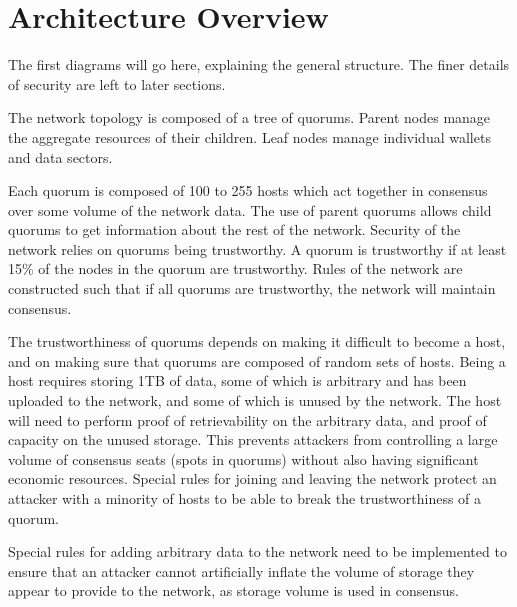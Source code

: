 \documentclass[twocolumn]{article}
\begin{document}
\section{Architecture Overview}
The first diagrams will go here, explaining the general structure.
The finer details of security are left to later sections.


The network topology is composed of a tree of quorums.
Parent nodes manage the aggregate resources of their children.
Leaf nodes manage individual wallets and data sectors.

Each quorum is composed of 100 to 255 hosts which act together in consensus over some volume of the network data.
The use of parent quorums allows child quorums to get information about the rest of the network.
Security of the network relies on quorums being trustworthy.
A quorum is trustworthy if at least 15\% of the nodes in the quorum are trustworthy.
Rules of the network are constructed such that if all quorums are trustworthy, the network will maintain consensus.

The trustworthiness of quorums depends on making it difficult to become a host, and on making sure that quorums are composed of random sets of hosts.
Being a host requires storing 1TB of data, some of which is arbitrary and has been uploaded to the network, and some of which is unused by the network.
The host will need to perform proof of retrievability on the arbitrary data, and proof of capacity on the unused storage.
This prevents attackers from controlling a large volume of consensus seats (spots in quorums) without also having significant economic resources.
Special rules for joining and leaving the network protect an attacker with a minority of hosts to be able to break the trustworthiness of a quorum.

Special rules for adding arbitrary data to the network need to be implemented to ensure that an attacker cannot artificially inflate the volume of storage they appear to provide to the network, as storage volume is used in consensus.
\end{document}
